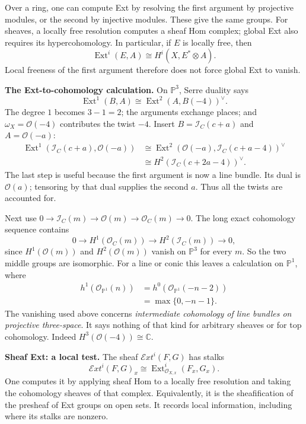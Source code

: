 \documentclass[11pt,a4paper]{article}
\theoremstyle{remark}
\begin{document}
Over a ring, one can compute Ext by
resolving the first argument by
projective modules, or the second by
injective modules. These give the same
groups. For sheaves, a locally free
resolution computes a sheaf Hom
complex; global Ext also requires
its hypercohomology. In particular,
if $E$ is locally free, then
$$
\operatorname{Ext}^i(E,A)
\cong H^i(X,E^*\otimes A).
$$
Local freeness of the first argument
therefore does not force global Ext
to vanish.

\textbf{The Ext-to-cohomology calculation.}
On $\mathbb{P}^3$, Serre duality says
$$
\operatorname{Ext}^1(B,A)
\cong\operatorname{Ext}^2
(A,B(-4))^\vee.
$$
The degree $1$ becomes $3-1=2$;
the arguments exchange places; and
$\omega_X=\mathcal{O}(-4)$ contributes
the twist $-4$.
Insert $B=\mathcal{I}_C(c+a)$ and
$A=\mathcal{O}(-a)$:
$$
\begin{aligned}
\operatorname{Ext}^1
(\mathcal{I}_C(c+a),\mathcal{O}(-a))
&\cong\operatorname{Ext}^2
(\mathcal{O}(-a),\mathcal{I}_C(c+a-4))^\vee
\\
&\cong H^2
(\mathcal{I}_C(c+2a-4))^\vee.
\end{aligned}
$$
The last step is useful because the
first argument is now a line bundle.
Its dual is $\mathcal{O}(a)$; tensoring
by that dual supplies the second $a$.
Thus all the twists are accounted for.

Next use
$0\to\mathcal{I}_C(m)\to\mathcal{O}(m)
\to\mathcal{O}_C(m)\to0$.
The long exact cohomology sequence
contains
$$
0\longrightarrow H^1(\mathcal{O}_C(m))
\longrightarrow H^2(\mathcal{I}_C(m))
\longrightarrow0,
$$
since $H^1(\mathcal{O}(m))$ and
$H^2(\mathcal{O}(m))$ vanish on
$\mathbb{P}^3$ for every $m$.
So the two middle groups are isomorphic.
For a line or conic this leaves a
calculation on $\mathbb{P}^1$, where
$$
\begin{aligned}
h^1(\mathcal{O}_{\mathbb{P}^1}(n))
&=h^0(\mathcal{O}_{\mathbb{P}^1}(-n-2))\\
&=\max\{0,-n-1\}.
\end{aligned}
$$
The vanishing used above concerns
\emph{intermediate cohomology of line
bundles on projective three-space}.
It says nothing of that kind for
arbitrary sheaves or for top cohomology.
Indeed $H^3(\mathcal{O}(-4))
\cong\mathbb{C}$.

\textbf{Sheaf Ext: a local test.}
The sheaf $\mathcal{E}xt^i(F,G)$ has
stalks
$$
\mathcal{E}xt^i(F,G)_x
\cong\operatorname{Ext}^i_{\mathcal{O}_{X,x}}
(F_x,G_x).
$$
One computes it by applying sheaf Hom
to a locally free resolution and taking
the cohomology sheaves of that complex.
Equivalently, it is the sheafification
of the presheaf of Ext groups on open
sets. It records local information,
including where its stalks are nonzero.
\end{document}
